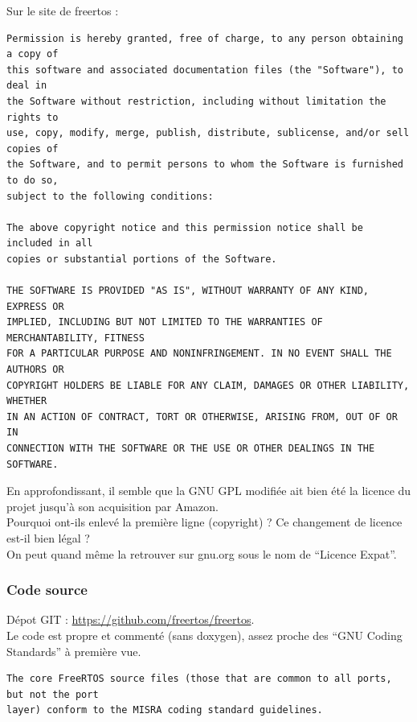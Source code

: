 Sur le site de freertos :
\begin{verbatim}
Permission is hereby granted, free of charge, to any person obtaining a copy of
this software and associated documentation files (the "Software"), to deal in
the Software without restriction, including without limitation the rights to
use, copy, modify, merge, publish, distribute, sublicense, and/or sell copies of
the Software, and to permit persons to whom the Software is furnished to do so,
subject to the following conditions:

The above copyright notice and this permission notice shall be included in all
copies or substantial portions of the Software.

THE SOFTWARE IS PROVIDED "AS IS", WITHOUT WARRANTY OF ANY KIND, EXPRESS OR
IMPLIED, INCLUDING BUT NOT LIMITED TO THE WARRANTIES OF MERCHANTABILITY, FITNESS
FOR A PARTICULAR PURPOSE AND NONINFRINGEMENT. IN NO EVENT SHALL THE AUTHORS OR
COPYRIGHT HOLDERS BE LIABLE FOR ANY CLAIM, DAMAGES OR OTHER LIABILITY, WHETHER
IN AN ACTION OF CONTRACT, TORT OR OTHERWISE, ARISING FROM, OUT OF OR IN
CONNECTION WITH THE SOFTWARE OR THE USE OR OTHER DEALINGS IN THE SOFTWARE.
\end{verbatim}

En approfondissant, il semble que la GNU GPL modifiée ait bien été la licence du
projet jusqu'à son acquisition par Amazon.\\

Pourquoi ont-ils enlevé la première ligne (copyright) ? Ce changement de licence
est-il bien légal ?\\

On peut quand même la retrouver sur gnu.org\cite{ref2} sous le nom de
\enquote{Licence Expat}.

\subsubsection{Code source}
Dépot GIT : \url{https://github.com/freertos/freertos}.\\

Le code est propre et commenté (sans doxygen), assez proche des \enquote{GNU Coding
Standards}\cite{ref4} à première vue.\\

{\small
\begin{verbatim}
The core FreeRTOS source files (those that are common to all ports, but not the port
layer) conform to the MISRA coding standard guidelines.
\end{verbatim}
}

